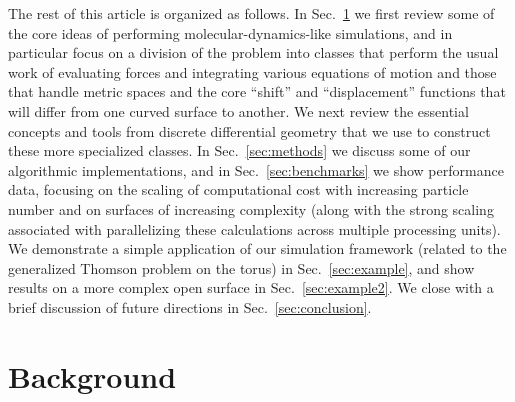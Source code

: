 \documentclass[preprint,12pt]{elsarticle}
\begin{document}
The rest of this article is organized as follows. In Sec.~\ref{sec:background} we first review some of the core ideas of performing molecular-dynamics-like simulations, and in particular focus on a division of the problem into classes that perform the usual work of evaluating forces and integrating various equations of motion \cite{frenkel2023understanding} and those that handle metric spaces and the core  ``shift'' and ``displacement'' functions \cite{schoenholz2021jax} that will differ from one curved surface to another. We next review the essential concepts and tools from discrete differential geometry that we use to construct these more specialized classes. In Sec.~\ref{sec:methods} we discuss some of our algorithmic implementations, and in Sec.~\ref{sec:benchmarks} we show performance data, focusing on the scaling of computational cost with increasing particle number and on surfaces of increasing complexity (along with the strong scaling associated with parallelizing these calculations across multiple processing units). We demonstrate a simple application of our simulation framework (related to the generalized Thomson problem on the torus) in Sec.~\ref{sec:example}, and show results on a more complex open surface in Sec.~\ref{sec:example2}. We close with a brief discussion of future directions in Sec.~\ref{sec:conclusion}.


\section{Background}\label{sec:background}
\end{document}
